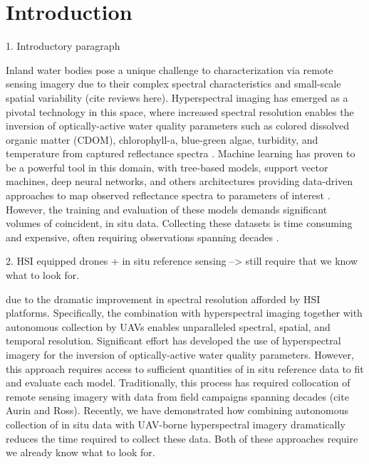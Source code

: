 \documentclass[remotesensing,article,submit,pdftex,moreauthors]{Definitions/mdpi}
\begin{document}
\section{Introduction}

1. Introductory paragraph 

Inland water bodies pose a unique challenge to characterization via remote sensing imagery due to their complex spectral characteristics and small-scale spatial variability (cite reviews here). Hyperspectral imaging has emerged as a pivotal technology in this space, where increased spectral resolution enables the inversion of optically-active water quality parameters such as colored dissolved organic matter (CDOM), chlorophyll-a, blue-green algae, turbidity, and temperature from captured reflectance spectra \cite{koponen2002lake,ritchie2003remote, bonansea2015using}. Machine learning has proven to be a powerful tool in this domain, with tree-based models, support vector machines, deep neural networks, and others architectures providing data-driven approaches to map observed reflectance spectra to parameters of interest \cite{thenkabail2018hyperspectral, ghatkar2019classification,sagan2020monitoring}. However, the training and evaluation of these models demands significant volumes of coincident, in situ data. Collecting these datasets is time consuming and expensive, often requiring observations spanning decades \cite{aurin2018remote, ross2019aquasat}. 



2. HSI equipped drones + in situ reference sensing --> still require that we know what to look for. 


due to the dramatic improvement in spectral resolution afforded by HSI platforms. Specifically, the combination with hyperspectral imaging together with autonomous collection by UAVs enables unparalleled spectral, spatial, and temporal resolution. Significant effort has developed the use of hyperspectral imagery for the inversion of optically-active water quality parameters. However, this approach requires access to sufficient quantities of in situ reference data to fit and evaluate each model. Traditionally, this process has required collocation of remote sensing imagery with data from field campaigns spanning decades (cite Aurin and Ross). Recently, we have demonstrated how combining autonomous collection of in situ data with UAV-borne hyperspectral imagery dramatically reduces the time required to collect these data. Both of these approaches require we already know what to look for. 
\end{document}
